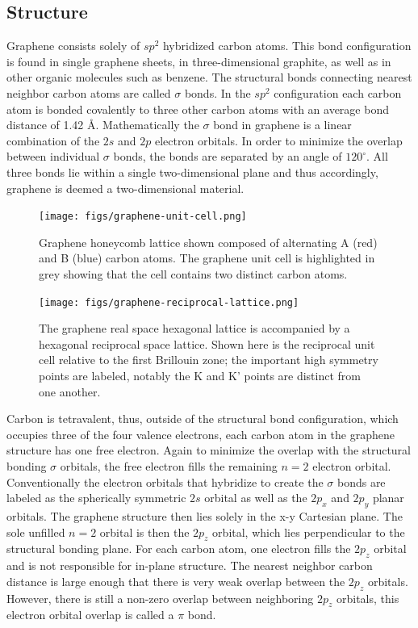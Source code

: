   \subsection{Structure}
 Graphene consists solely of $sp^2$ hybridized carbon atoms. This bond configuration is found in single graphene sheets, in three-dimensional graphite, as well as in other organic molecules such as benzene. The structural bonds connecting nearest neighbor carbon atoms are called $\sigma$ bonds. In the $sp^2$ configuration each carbon atom is bonded covalently to three other carbon atoms with an average bond distance of 1.42 {\AA}. Mathematically the $\sigma$ bond in graphene is a linear combination of the $2s$ and $2p$ electron orbitals. In order to minimize the overlap between individual $\sigma$ bonds, the bonds are separated by an angle of $120^{\circ}$. All three bonds lie within a single two-dimensional plane and thus accordingly, graphene is deemed a two-dimensional material.

 \begin{figure}
    \centering
         \texttt{[image: figs/graphene-unit-cell.png]}
    \caption{
Graphene honeycomb lattice shown composed of alternating A (red) and B (blue) carbon atoms. The graphene unit cell is highlighted in grey showing that the cell contains two distinct carbon atoms.
}
    \label{fig:graphene}
\end{figure}


 \begin{figure}
     \centering
         \texttt{[image: figs/graphene-reciprocal-lattice.png]}
     \caption{ The graphene real space hexagonal lattice is accompanied by a hexagonal reciprocal space lattice. Shown here is the reciprocal unit cell relative to the first Brillouin zone; the important high symmetry points are labeled, notably the K and K' points are distinct from one another.
}
     \label{fig:graphene-reciprocal}
\end{figure}

 Carbon is tetravalent, thus, outside of the structural bond configuration, which occupies three of the four valence electrons, each carbon atom in the graphene structure has one free electron. Again to minimize the overlap with the structural bonding $\sigma$ orbitals, the free electron fills the remaining $n=2$ electron orbital. Conventionally the electron orbitals that hybridize to create the $\sigma$ bonds are labeled as the spherically symmetric $2s$ orbital as well as the $2p_x$ and $2p_y$ planar orbitals. The graphene structure then lies solely in the x-y Cartesian plane. The sole unfilled $n=2$ orbital is then the $2p_z$ orbital, which lies perpendicular to the structural bonding plane. For each carbon atom, one electron fills the $2p_z$ orbital and is not responsible for in-plane structure. The nearest neighbor carbon distance is large enough that there is very weak overlap between the $2p_z$ orbitals. However, there is still a non-zero overlap between neighboring $2p_z$ orbitals, this electron orbital overlap is called a $\pi$ bond.

